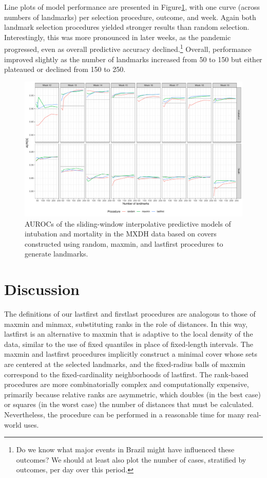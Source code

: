 \documentclass[
]{article}
\begin{document}
Line plots of model performance are presented in
Figure\nbs\ref{fig:knn-mx}, with one curve (across numbers of landmarks)
per selection procedure, outcome, and week. Again both landmark
selection procedures yielded stronger results than random selection.
Interestingly, this was more pronounced in later weeks, as the pandemic
progressed, even as overall predictive accuracy declined.\footnote{Do we
  know what major events in Brazil might have influenced these outcomes?
  We should at least also plot the number of cases, stratified by
  outcomes, per day over this period.} Overall, performance improved
slightly as the number of landmarks increased from 50 to 150 but either
plateaued or declined from 150 to 250.

\begin{figure}
\includegraphics[width=\textwidth]{../figures/knn-auc-mx-gaussian}
\caption{
AUROCs of the sliding-window interpolative predictive models of intubation and mortality in the MXDH data based on covers constructed using random, maxmin, and lastfirst procedures to generate landmarks.
\label{fig:knn-mx}
}
\end{figure}

\hypertarget{discussion}{%
\section{Discussion}\label{discussion}}

The definitions of our lastfirst and firstlast procedures are analogous
to those of maxmin and minmax, substituting ranks in the role of
distances. In this way, lastfirst is an alternative to maxmin that is
adaptive to the local density of the data, similar to the use of fixed
quantiles in place of fixed-length intervals. The maxmin and lastfirst
procedures implicitly construct a minimal cover whose sets are centered
at the selected landmarks, and the fixed-radius balls of maxmin
correspond to the fixed-cardinality neighborhoods of lastfirst. The
rank-based procedures are more combinatorially complex and
computationally expensive, primarily because relative ranks are
asymmetric, which doubles (in the best case) or squares (in the worst
case) the number of distances that must be calculated. Nevertheless, the
procedure can be performed in a reasonable time for many real-world
uses.
\end{document}
